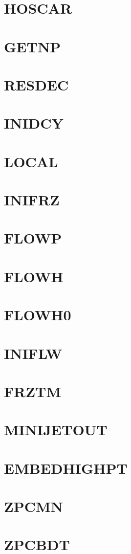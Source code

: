 \documentclass[10pt,UTF8]{ctexbook}
\begin{document}
\section{HOSCAR}
\section{GETNP}
\section{RESDEC}
\section{INIDCY}
\section{LOCAL}
\section{INIFRZ}
\section{FLOWP}
\section{FLOWH}
\section{FLOWH0}
\section{INIFLW}
\section{FRZTM}
\section{MINIJETOUT}
\section{EMBEDHIGHPT}
\section{ZPCMN}
\section{ZPCBDT}
\end{document}
